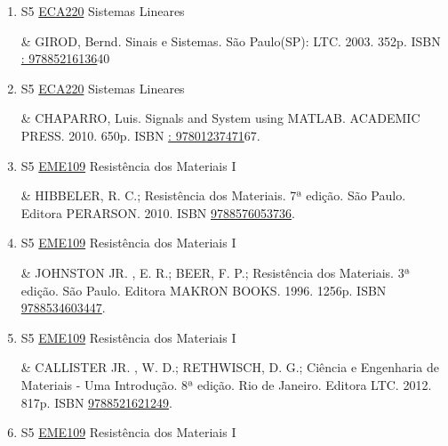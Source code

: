 \documentclass[12pt,a4paper]{book}
\begin{document}
\begin{enumerate}
&  ROBERTS, M.  J.  Fundamentos em Sinais e Sistemas.  Porto Alegre(RS): MCGRAW HILL - ARTMED.  2009.  764p.  ISBN \href{http://www.bn.br/site/pages/servicosProfissionais/agenciaISBN/isbnBusca/FbnBuscaISBNCatalogo.asp?pField=ISBN&pIntPagina=1&pISBN=77260386&nidbISBN=true&hidbISBN=true}{9788577260386}
 

 \item S5 \hyperref[PUD:ECA220]{ECA220} Sistemas Lineares

&  GIROD, Bernd.  Sinais e Sistemas.  São Paulo(SP): LTC.  2003.  352p.  ISBN \href{http://www.google.com/search?hl=pt-BR&tbo=p&tbm=bks&q=isbn:: 97885216136&num=10}{: 97885216136}40
 

 \item S5 \hyperref[PUD:ECA220]{ECA220} Sistemas Lineares

&  CHAPARRO, Luis.  Signals and System using MATLAB.  ACADEMIC PRESS.  2010.  650p.  ISBN \href{http://www.google.com/search?hl=pt-BR&tbo=p&tbm=bks&q=isbn:: 97801237471&num=10}{: 97801237471}67.
 \item S5 \hyperref[PUD:EME109]{EME109} Resistência dos Materiais I

& HIBBELER, R.  C.;  Resistência dos Materiais.  7ª edição.  São Paulo.  Editora PERARSON.  2010.  ISBN \href{http://www.bn.br/site/pages/servicosProfissionais/agenciaISBN/isbnBusca/FbnBuscaISBNCatalogo.asp?pField=ISBN&pIntPagina=1&pISBN=76053736&nidbISBN=true&hidbISBN=true}{9788576053736}. 
 

 \item S5 \hyperref[PUD:EME109]{EME109} Resistência dos Materiais I

& JOHNSTON JR. , E.  R.;  BEER, F.  P.;  Resistência dos Materiais.  3ª edição.  São Paulo.  Editora MAKRON BOOKS. 1996.  1256p.  ISBN \href{http://www.bn.br/site/pages/servicosProfissionais/agenciaISBN/isbnBusca/FbnBuscaISBNCatalogo.asp?pField=ISBN&pIntPagina=1&pISBN=34603447&nidbISBN=true&hidbISBN=true}{9788534603447}. 
 

 \item S5 \hyperref[PUD:EME109]{EME109} Resistência dos Materiais I

& CALLISTER JR. , W.  D.;  RETHWISCH, D.  G.;  Ciência e Engenharia de Materiais - Uma Introdução.  8ª edição.  Rio de Janeiro.  Editora LTC.  2012.  817p.  ISBN \href{http://www.bn.br/site/pages/servicosProfissionais/agenciaISBN/isbnBusca/FbnBuscaISBNCatalogo.asp?pField=ISBN&pIntPagina=1&pISBN=21621249&nidbISBN=true&hidbISBN=true}{9788521621249}.
 \item S5 \hyperref[PUD:EME109]{EME109} Resistência dos Materiais I


\end{enumerate}
\end{document}

